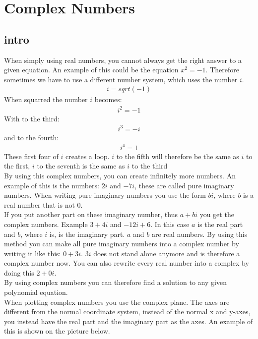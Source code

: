 \chapter{Complex Numbers}
\section{intro}
When simply using real numbers, you cannot always get the right answer to a given equation. An example of this could be the equation $x^2=-1$. Therefore sometimes we have to use a different number system, which uses the number $i$. 
\begin{align*}
i=sqrt(-1)
\end{align*}
When squarred the number $i$ becomes:
\begin{align*}
i^2=-1
\end{align*}
With to the third:
\begin{align*}
i^3=-i
\end{align*}
and to the fourth:
\begin{align*}
i^4=1
\end{align*}
These first four of $i$ creates a loop. $i$ to the fifth will therefore be the same as $i$ to the first, $i$ to the seventh is the same as $i$ to the third \\
By using this complex numbers, you can create infinitely more numbers.  
An example of this is the numbers: $2i$ and $-7i$, these are called pure imaginary numbers. When writing pure imaginary numbers you use the form $bi$, where $b$ is a real number that is not $0$. \\
If you put another part on these imaginary number, thus $a+bi$ you get the complex numbers. Example $3+4i$ and $-12i+6$. In this case $a$ is the real part and $b$, where $i$ is, is the imaginary part. $a$ and $b$ are real numbers. By using this method you can make all pure imaginary numbers into a complex number by writing it like this: $0+3i$. $3i$ does not stand alone anymore and is therefore a complex number now. You can also rewrite every real number into a complex by doing this $2+0i$. \\
By using complex numbers you can therefore find a solution to any given polynomial equation. \\ 
When plotting complex numbers you use the complex plane. The axes are different from the normal coordinate system, instead of the normal x and y-axes, you instead have the real part and the imaginary part as the axes. An example of this is shown on the picture below.
